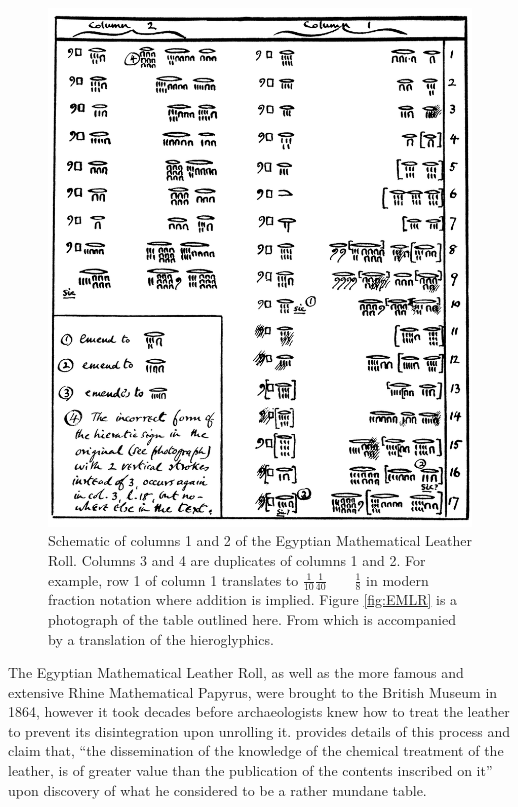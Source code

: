 \begin{figure}
  \centering
  \includegraphics[width=\textwidth]{gfx/EMLRschematic}
  \caption[Schematic of columns 1 and 2 of the Egyptian Mathematical Leather Roll.]
  {Schematic of columns 1 and 2 of the Egyptian Mathematical Leather Roll. Columns 3 and 4 are duplicates of columns 1 and 2. For example, row 1 of column 1 translates to $\displaystyle \frac{1}{10}\frac{1}{40} \quad\quad \frac{1}{8}$ in modern fraction notation where addition is implied. Figure \ref{fig:EMLR} is a photograph of the table outlined here. From \citet{Glanville27} which is accompanied by a translation of the hieroglyphics.}
  \label{fig:EMLRschematic}
\end{figure}

The Egyptian Mathematical Leather Roll, as well as the more famous and extensive Rhine Mathematical Papyrus, were brought to the British Museum in 1864, however it took decades before archaeologists knew how to treat the leather to prevent its disintegration upon unrolling it. \citet{Scott27} provides details of this process and claim that, ``the dissemination of the knowledge of the chemical treatment of the leather, is of greater value than the publication of the contents inscribed on it'' upon discovery of what he considered to be a rather mundane table.

